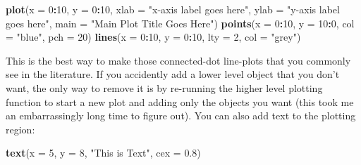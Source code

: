\documentclass[]{book}
\newenvironment{Shaded}{\begin{snugshade}}{\end{snugshade}}
\newcommand{\KeywordTok}[1]{\textcolor[rgb]{0.13,0.29,0.53}{\textbf{#1}}}
\newcommand{\DataTypeTok}[1]{\textcolor[rgb]{0.13,0.29,0.53}{#1}}
\newcommand{\DecValTok}[1]{\textcolor[rgb]{0.00,0.00,0.81}{#1}}
\newcommand{\FloatTok}[1]{\textcolor[rgb]{0.00,0.00,0.81}{#1}}
\newcommand{\StringTok}[1]{\textcolor[rgb]{0.31,0.60,0.02}{#1}}
\newcommand{\OperatorTok}[1]{\textcolor[rgb]{0.81,0.36,0.00}{\textbf{#1}}}
\newcommand{\NormalTok}[1]{#1}
\theoremstyle{definition}
\theoremstyle{definition}
\theoremstyle{definition}
\theoremstyle{remark}
\begin{document}
\begin{Shaded}
\begin{Highlighting}[]
\KeywordTok{plot}\NormalTok{(}\DataTypeTok{x =} \DecValTok{0}\OperatorTok{:}\DecValTok{10}\NormalTok{, }\DataTypeTok{y =} \DecValTok{0}\OperatorTok{:}\DecValTok{10}\NormalTok{, }\DataTypeTok{xlab =} \StringTok{"x-axis label goes here"}\NormalTok{,}
     \DataTypeTok{ylab =} \StringTok{"y-axis label goes here"}\NormalTok{, }\DataTypeTok{main =} \StringTok{"Main Plot Title Goes Here"}\NormalTok{)}
\KeywordTok{points}\NormalTok{(}\DataTypeTok{x =} \DecValTok{0}\OperatorTok{:}\DecValTok{10}\NormalTok{, }\DataTypeTok{y =} \DecValTok{10}\OperatorTok{:}\DecValTok{0}\NormalTok{, }\DataTypeTok{col =} \StringTok{"blue"}\NormalTok{, }\DataTypeTok{pch =} \DecValTok{20}\NormalTok{)}
\KeywordTok{lines}\NormalTok{(}\DataTypeTok{x =} \DecValTok{0}\OperatorTok{:}\DecValTok{10}\NormalTok{, }\DataTypeTok{y =} \DecValTok{0}\OperatorTok{:}\DecValTok{10}\NormalTok{, }\DataTypeTok{lty =} \DecValTok{2}\NormalTok{, }\DataTypeTok{col =} \StringTok{"grey"}\NormalTok{)}
\end{Highlighting}
\end{Shaded}

This is the best way to make those connected-dot line-plots that you
commonly see in the literature. If you accidently add a lower level
object that you don't want, the only way to remove it is by re-running
the higher level plotting function to start a new plot and adding only
the objects you want (this took me an embarrassingly long time to figure
out). You can also add text to the plotting region:

\begin{Shaded}
\begin{Highlighting}[]
\KeywordTok{text}\NormalTok{(}\DataTypeTok{x =} \DecValTok{5}\NormalTok{, }\DataTypeTok{y =} \DecValTok{8}\NormalTok{, }\StringTok{"This is Text"}\NormalTok{, }\DataTypeTok{cex =} \FloatTok{0.8}\NormalTok{)}
\end{Highlighting}
\end{Shaded}
\end{document}
